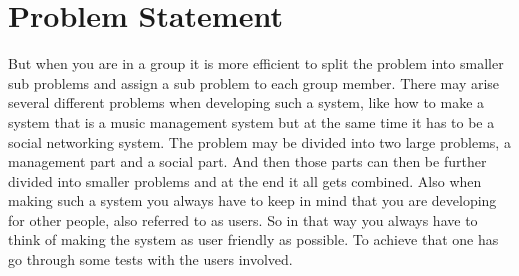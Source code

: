 \section{Problem Statement}
But when you are in a group it is more efficient to split the problem into 
smaller sub problems and assign a sub problem to each group member. 
There may arise several different problems when developing such a system, 
like how to make a system that is a music management system but at the same 
time it has to be a social networking system.
The problem may be divided into two large problems, 
a management part and a social part. And then those parts can then be further 
divided into smaller problems and at the end it all gets combined.
Also when making such a system you always have to keep in mind that you are 
developing for other people, also referred to as users.
So in that way you always have to think of making the system as user friendly 
as possible. To achieve that one has go through some tests with the users 
involved. 